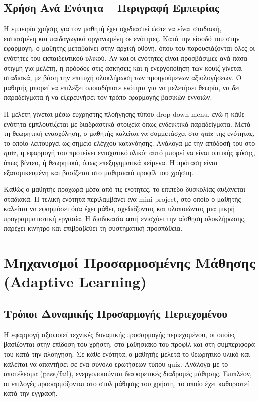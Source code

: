 \documentclass[11pt]{report}
\begin{document}
\section{Χρήση Ανά Ενότητα – Περιγραφή Εμπειρίας}

Η εμπειρία χρήσης για τον μαθητή έχει σχεδιαστεί ώστε να είναι σταδιακή, εστιασμένη και παιδαγωγικά οργανωμένη σε ενότητες. Κατά την είσοδό του στην εφαρμογή, ο μαθητής μεταβαίνει στην αρχική οθόνη, όπου του παρουσιάζονται όλες οι ενότητες του εκπαιδευτικού υλικού. Αν και οι ενότητες είναι προσβάσιμες ανά πάσα στιγμή για μελέτη, η πρόοδος στις ασκήσεις και η ενεργοποίηση των κουίζ γίνεται σταδιακά, με βάση την επιτυχή ολοκλήρωση των προηγούμενων αξιολογήσεων. Ο μαθητής μπορεί να επιλέξει οποιαδήποτε ενότητα για να μελετήσει θεωρία, να δει παραδείγματα ή να εξερευνήσει τον τρόπο εφαρμογής βασικών εννοιών. 

Η μελέτη γίνεται μέσω εύχρηστης πλοήγησης τύπου drop-down menu, ενώ η κάθε ενότητα εμπλουτίζεται με διαδραστικά στοιχεία όπως ενδεικτικά παραδείγματα. Μετά τη θεωρητική ενασχόληση, ο μαθητής καλείται να συμμετάσχει στο quiz της ενότητας, το οποίο λειτουργεί ως σημείο ελέγχου κατανόησης. Ανάλογα με την απόδοσή του στο quiz, η εφαρμογή του προτείνει ενισχυτικό υλικό: αυτό μπορεί να είναι οπτικής φύσης, όπως βίντεο, ή θεωρητικό, όπως επεξηγηματικά κείμενα. Η πρόταση είναι εξατομικευμένη και βασίζεται στο μαθησιακό προφίλ του χρήστη. 

Καθώς ο μαθητής προχωρά μέσα από τις ενότητες, το επίπεδο δυσκολίας αυξάνεται σταδιακά. Η τελική ενότητα περιλαμβάνει ένα mini project, στο οποίο ο μαθητής καλείται να εφαρμόσει όσα έχει μάθει, σχεδιάζοντας και υλοποιώντας μια μικρή προγραμματιστική εργασία. Η διαδικασία αυτή ενισχύει την αίσθηση ολοκλήρωσης, παρέχει κίνητρο και επιβραβεύει τη συστηματική προσπάθεια.  


\chapter{Μηχανισμοί Προσαρμοσμένης Μάθησης (Adaptive Learning)}
\section{Τρόποι Δυναμικής Προσαρμογής Περιεχομένου}

Η εφαρμογή αξιοποιεί τεχνικές δυναμικής προσαρμογής περιεχομένου, οι οποίες βασίζονται στην επίδοση του χρήστη, στο μαθησιακό του προφίλ και στη συμπεριφορά του κατά την πλοήγηση. Σε κάθε ενότητα, ο μαθητής μελετά το θεωρητικό υλικό και καλείται να απαντήσει σε ένα σύνολο ερωτήσεων τύπου quiz. Ανάλογα με το αποτέλεσμα (pass/fail), ενεργοποιούνται διαφορετικές διαδρομές μάθησης. Επιπλέον, οι επιλογές προσαρμόζονται στο στυλ μάθησης του χρήστη, το οποίο έχει καθοριστεί κατά την εγγραφή. 
\end{document}
